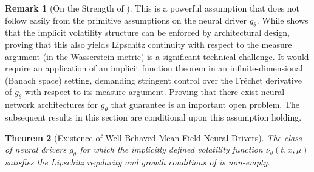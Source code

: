 \documentclass[qian]{imsart}
\theoremstyle{plain}
\newtheorem{theorem}{Theorem}[section]
\theoremstyle{definition}
\newtheorem{remark}[theorem]{Remark}
\begin{document}
\begin{remark}[On the Strength of ]
\label{rem:mckean_lipschitz_revised}
This is a powerful assumption that does not follow easily from the primitive assumptions on the neural driver $g_\theta$. While  shows that the implicit volatility structure can be enforced by architectural design, proving that this also yields Lipschitz continuity with respect to the measure argument (in the Wasserstein metric) is a significant technical challenge. It would require an application of an implicit function theorem in an infinite-dimensional (Banach space) setting, demanding stringent control over the Fréchet derivative of $g_\theta$ with respect to its measure argument. Proving that there exist neural network architectures for $g_\theta$ that guarantee  is an important open problem. The subsequent results in this section are conditional upon this assumption holding.
\end{remark}

\begin{theorem}[Existence of Well-Behaved Mean-Field Neural Drivers]
\label{thm:mckean_driver_existence}
The class of neural drivers $g_\theta$ for which the implicitly defined volatility function $\nu_\theta(t,x,\mu)$ satisfies the Lipschitz regularity and growth conditions of  is non-empty.
\end{theorem}
\end{document}
